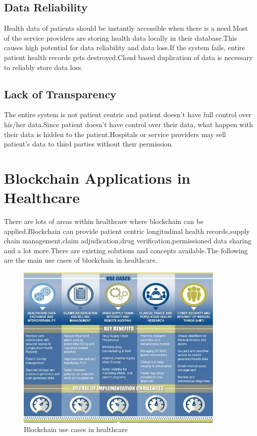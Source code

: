 \documentclass[12pt]{report}
\begin{document}
\section{Data Reliability}
Health data of patients should be instantly accessible when there is a need.Most of the service providers are storing health data locally in their database.This causes high potential for data reliability and data loss.If the system fails, entire patient health records gets destroyed.Cloud based duplication of data is necessary to reliably store data loss.

\section{Lack of Transparency}
The entire system is not patient centric and patient doesn't have full control over his/her data.Since patient doesn't have control over their data, what happen with their data is hidden to the patient.Hospitals or service providers may sell patient's data to third parties without their permission.

\chapter{Blockchain Applications in Healthcare}
There are lots of areas within healthcare where blockchain can be applied.Blockchain can provide patient centric longitudinal health records,supply chain management,claim adjudication,drug verification,permissioned data sharing and a lot more.There are existing solutions and concepts available.The following are the main use cases of blockchain in  healthcare.
\begin{figure}[H]
\centering
\includegraphics[width=0.9\textwidth]{apps.jpg}
\caption{Blockchain use cases in healthcare\cite{13}}
\label{usecase}
\end{figure}
\end{document}
